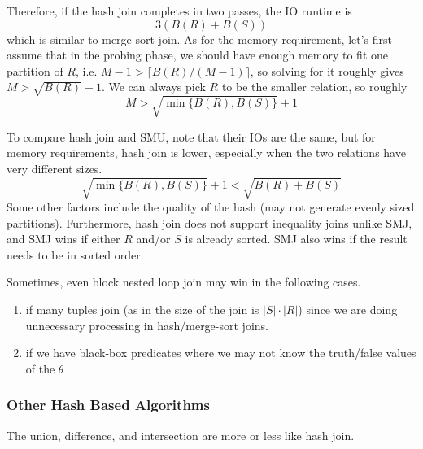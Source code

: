 \begin{definition}
      Therefore, if the hash join completes in two passes, the IO runtime is 
      \begin{equation}
        3 ( B(R) + B(S)) 
      \end{equation}
      which is similar to merge-sort join. As for the memory requirement, let's first assume that in the probing phase, we should have enough memory to fit one partition of $R$, i.e. $M-1 > \lceil B(R) / (M-1) \rceil$, so solving for it roughly gives $M > \sqrt{B(R)} + 1$. We can always pick $R$ to be the smaller relation, so roughly 
      \begin{equation}
        M > \sqrt{\min\{ B(R), B(S)\}} + 1
      \end{equation}
    \end{definition}

    \begin{theorem}
      To compare hash join and SMU, note that their IOs are the same, but for memory requirements, hash join is lower, especially when the two relations have very different sizes. 
      \begin{equation}
        \sqrt{\min\{B(R), B(S)\}} + 1 < \sqrt{B(R) + B(S)}
      \end{equation}
      Some other factors include the quality of the hash (may not generate evenly sized partitions). Furthermore, hash join does not support inequality joins unlike SMJ, and SMJ wins if either $R$ and/or $S$ is already sorted. SMJ also wins if the result needs to be in sorted order. 
    \end{theorem}

    Sometimes, even block nested loop join may win in the following cases. 
    \begin{enumerate}
      \item if many tuples join (as in the size of the join is $|S| \cdot |R|$) since we are doing unnecessary processing in hash/merge-sort joins. 
      \item if we have black-box predicates where we may not know the truth/false values of the $\theta$
    \end{enumerate}

  \subsubsection{Other Hash Based Algorithms}

    The union, difference, and intersection are more or less like hash join. 

